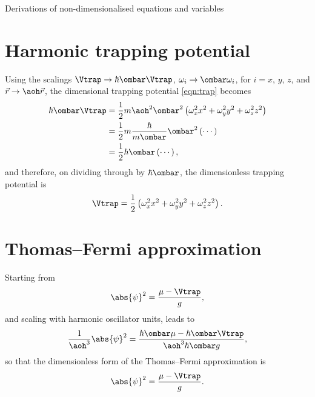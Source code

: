 \begin{chapter}{\label{cha:nondim}Derivations of non-dimensionalised equations
and variables}
  \section{Harmonic trapping potential}
  Using the scalings $\Vtrap \to \hbar \ombar \Vtrap$,  $\omega_{i} \to \ombar
  \omega_{i}$, for $i=x$, $y$, $z$, and $\vec{r} \to \aoh \vec{r}$, the
  dimensional trapping potential \eqref{eqn:trap} becomes
  \begin{equation*}
    \begin{aligned}
      \hbar \ombar \Vtrap &= \frac{1}{2} m \aoh^{2} \ombar^{2} \left(
      \omega_{x}^{2} x^{2} + \omega_{y}^{2} y^{2} + \omega_{z}^{2} z^{2}
      \right) \\
      &= \frac{1}{2} m \frac{\hbar}{m \ombar} \ombar^{2} \left( \cdots \right)
      \\
      &= \frac{1}{2} \hbar \ombar \left( \cdots \right),
    \end{aligned}
  \end{equation*}
  and therefore, on dividing through by $\hbar \ombar$, the dimensionless
  trapping potential is
  \begin{equation*}
    \Vtrap = \frac{1}{2} \left( \omega_{x}^{2} x^{2} + \omega_{y}^{2} y^{2} +
    \omega_{z}^{2} z^{2} \right).
  \end{equation*}

  \section{Thomas--Fermi approximation}
  Starting from
  \begin{equation*}
    \abs{\psi}^{2} = \frac{\mu - \Vtrap}{g},
  \end{equation*}
  and scaling with harmonic oscillator units, leads to
  \begin{equation*}
    \frac{1}{\aoh^{3}} \abs{\psi}^{2} = \frac{\hbar \ombar \mu - \hbar \ombar
    \Vtrap}{\aoh^{3} \hbar \ombar g},
  \end{equation*}
  so that the dimensionless form of the Thomas--Fermi approximation is
  \begin{equation*}
    \abs{\psi}^{2} = \frac{\mu - \Vtrap}{g}.
  \end{equation*}


\end{chapter}
